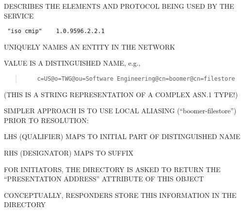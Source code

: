 \begin{bwslide}

\begin{nrtc}
\item	DESCRIBES THE ELEMENTS AND PROTOCOL BEING USED BY THE SERVICE

\item	\begin{verbatim} "iso cmip"    1.0.9596.2.2.1 \end{verbatim}
\end{nrtc}
\end{bwslide}


\begin{bwslide}

\begin{nrtc}
\item	UNIQUELY NAMES AN ENTITY IN THE NETWORK
\item	VALUE IS A DISTINGUISHED NAME, e.g.,
\begin{quote}\small\begin{verbatim}
	c=US@o=TWG@ou=Software Engineering@cn=boomer@cn=filestore
	\end{verbatim}\end{quote}
	(THIS IS A STRING REPRESENTATION OF A COMPLEX ASN.1 TYPE!)
\item	SIMPLER APPROACH IS TO USE LOCAL ALIASING (``boomer-filestore'') PRIOR TO
	RESOLUTION:
	\begin{nrtc}
	\item	LHS (QUALIFIER) MAPS TO INITIAL PART OF DISTINGUISHED NAME
	\item	RHS (DESIGNATOR) MAPS TO SUFFIX
	\end{nrtc}
\end{nrtc}
\end{bwslide}


\begin{bwslide}

\begin{nrtc}
\item	FOR INITIATORS, THE DIRECTORY IS ASKED TO RETURN THE ``PRESENTATION ADDRESS''
	ATTRIBUTE OF THIS OBJECT
\item	CONCEPTUALLY, RESPONDERS STORE THIS INFORMATION IN THE DIRECTORY
\end{nrtc}
\end{bwslide}


